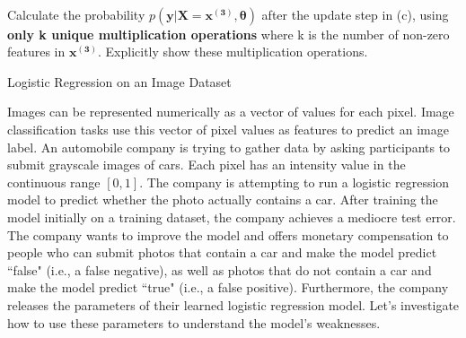 \documentclass[11pt,addpoints,answers]{exam}
\newcommand{\yv}{\mathbf{y}}
\newcommand{\thetav     }{\boldsymbol \theta     }
\begin{document}
\begin{questions}
\begin{parts}
\begin{table}[h]
\begin{tabular}{cll}
    \bottomrule
    \end{tabular}
    \end{table}\\
    Calculate the probability $p\left(\yv|\mathbf{X=x^{(3)}},\thetav\right)$ after the update step in (c), using \textbf{only k unique multiplication operations} where k is the number of non-zero features in $\mathbf{x^{(3)}}$. Explicitly show these multiplication operations.

    
    \begin{your_solution}[title=Answer including work showing multiplication operations, height=10cm]
    \end{your_solution}



 \clearpage
 
 \end{parts}
 
 {\Large \question Logistic Regression on an Image Dataset}
\label{sec:images}

Images can be represented numerically as a vector of values for each pixel. Image classification tasks use this vector of pixel values as features to predict an image label.  
An automobile company is trying to gather data by asking participants to submit grayscale images of cars. Each pixel has an intensity value in the continuous range $[0,1]$. The company is attempting to run a logistic regression model to predict whether the photo actually contains a car. After training the model initially on a training dataset, the company achieves a mediocre test error. The company wants to improve the model and offers monetary compensation to people who can submit photos that contain a car and make the model predict ``false" (i.e., a false negative), as well as photos that do not contain a car and make the model predict ``true" (i.e., a false positive). Furthermore, the company releases the parameters of their learned logistic regression model. Let's investigate how to use these parameters to understand the model's weaknesses.

\end{questions}
\end{document}
